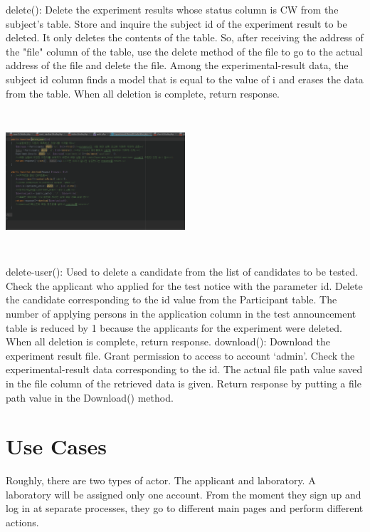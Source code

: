 \documentclass[letterpaper, 10 pt, conference]{ieeeconf}  %
\begin{document}
delete(): Delete the experiment results whose status column is CW from the subject's table. Store and inquire the subject id of the experiment result to be deleted. It only deletes the contents of the table. So, after receiving the address of the "file" column of the table, use the delete method of the file to go to the actual address of the file and delete the file. Among the experimental-result data, the subject id column finds a model that is equal to the value of i and erases the data from the table. When all deletion is complete, return response.
\begin{center}
\includegraphics[width=0.5\textwidth,height = 5.25cm]{class/f4.png}
\end{center}
delete-user(): Used to delete a candidate from the list of candidates to be tested. Check the applicant who applied for the test notice with the parameter id. Delete the candidate corresponding to the id value from the Participant table. The number of applying persons in the application column in the test announcement table is reduced by 1 because the applicants for the experiment were deleted. When all deletion is complete, return response.
download(): Download the experiment result file. Grant permission to access to account ‘admin’. Check the experimental-result data corresponding to the id. The actual file path value saved in the file column of the retrieved data is given. Return response by putting a file path value in the Download() method.

\section{Use Cases}

\begin{center}
\end{center}
Roughly, there are two types of actor. The applicant and laboratory. A laboratory will be assigned only one account. From the moment they sign up and log in at separate processes, they go to different main pages and perform different actions. 
\end{document}
